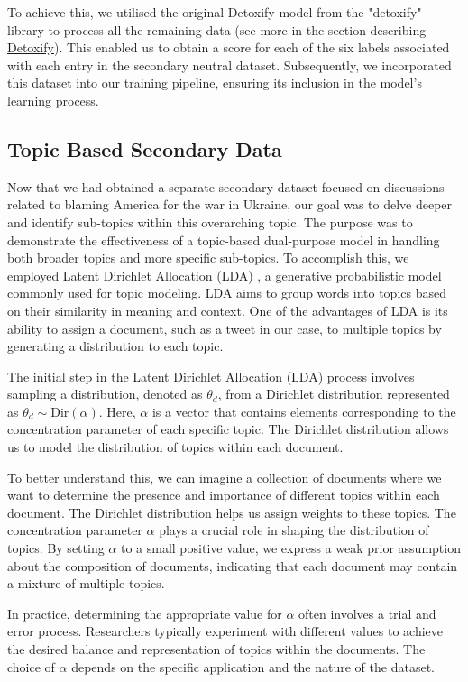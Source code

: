 To achieve this, we utilised the original Detoxify model from the "detoxify" library \cite{Detoxify} to process all the remaining data (see more in the section describing \hyperref[sec:Detoxify]{Detoxify}). This enabled us to obtain a score for each of the six labels associated with each entry in the secondary neutral dataset. Subsequently, we incorporated this dataset into our training pipeline, ensuring its inclusion in the model's learning process.

\subsection{Topic Based Secondary Data}
\label{topic_based_sec_data}

Now that we had obtained a separate secondary dataset focused on discussions related to blaming America for the war in Ukraine, our goal was to delve deeper and identify sub-topics within this overarching topic. The purpose was to demonstrate the effectiveness of a topic-based dual-purpose model in handling both broader topics and more specific sub-topics. To accomplish this, we employed Latent Dirichlet Allocation (LDA) \cite{lda}, a generative probabilistic model commonly used for topic modeling. LDA aims to group words into topics based on their similarity in meaning and context. One of the advantages of LDA is its ability to assign a document, such as a tweet in our case, to multiple topics by generating a distribution to each topic.

The initial step in the Latent Dirichlet Allocation (LDA) process involves sampling a distribution, denoted as $\theta_{d}$, from a Dirichlet distribution represented as $\theta_{d} \sim \text{Dir}(\alpha)$. Here, $\alpha$ is a vector that contains elements corresponding to the concentration parameter of each specific topic. The Dirichlet distribution allows us to model the distribution of topics within each document.

To better understand this, we can imagine a collection of documents where we want to determine the presence and importance of different topics within each document. The Dirichlet distribution helps us assign weights to these topics. The concentration parameter $\alpha$ plays a crucial role in shaping the distribution of topics. By setting $\alpha$ to a small positive value, we express a weak prior assumption about the composition of documents, indicating that each document may contain a mixture of multiple topics.

In practice, determining the appropriate value for $\alpha$ often involves a trial and error process. Researchers typically experiment with different values to achieve the desired balance and representation of topics within the documents. The choice of $\alpha$ depends on the specific application and the nature of the dataset.

